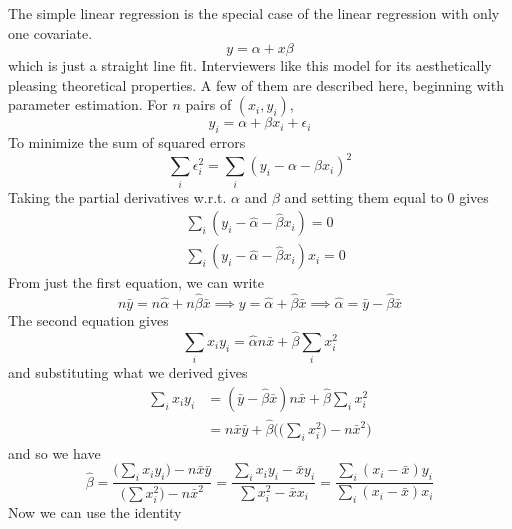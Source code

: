 \documentclass{article}
\begin{document}
    The simple linear regression is the special case of the linear regression with only one covariate. 
    \begin{equation}
      y = \alpha + x \beta
    \end{equation}
    which is just a straight line fit. Interviewers like this model for its aesthetically pleasing theoretical properties. A few of them are described here, beginning with parameter estimation. For $n$ pairs of $(x_i, y_i)$, 
    \begin{equation}
      y_i = \alpha + \beta x_i + \epsilon_i
    \end{equation}
    To minimize the sum of squared errors 
    \begin{equation}
      \sum_{i} \epsilon_i^2 = \sum_{i} (y_i - \alpha - \beta x_i)^2
    \end{equation}
    Taking the partial derivatives w.r.t. $\alpha$ and $\beta$ and setting them equal to $0$ gives 
    \begin{align*}
      &\sum_i (y_i - \hat{\alpha} - \hat{\beta} x_i) = 0 \\
      &\sum_i (y_i - \hat{\alpha} - \hat{\beta} x_i) x_i = 0
    \end{align*}
    From just the first equation, we can write 
    \begin{equation}
      n \bar{y} = n \hat{\alpha} + n \hat{\beta} \bar{x} \implies y = \hat{\alpha} + \hat{\beta} \bar{x} \implies \hat{\alpha}  = \bar{y} - \hat{\beta} \bar{x} 
    \end{equation}
    The second equation gives 
    \begin{equation}
      \sum_{i} x_i y_i = \hat{\alpha} n \bar{x} + \hat{\beta} \sum_{i} x_i^2
    \end{equation}
    and substituting what we derived gives 
    \begin{align*}
      \sum_{i} x_i y_i & = (\bar{y} - \hat{\beta} \bar{x}) n \bar{x} + \hat{\beta} \sum_i x_i^2 \\
      & = n \bar{x} \bar{y} + \hat{\beta} \bigg( \Big(\sum_i x_i^2 \Big) - n \bar{x}^2 \bigg)
    \end{align*}
    and so we have 
    \begin{equation}
      \hat{\beta} = \frac{ \big( \sum_i x_i y_i \big) - n \bar{x}\bar{y}}{\big( \sum x_i^2 \big) - n \bar{x}^2} = \frac{ \sum_i x_i y_i - \bar{x} y_i}{\sum x_i^2 - \bar{x} x_i} = \frac{ \sum_i (x_i - \bar{x}) y_i}{\sum_i (x_i - \bar{x}) x_i}
    \end{equation}
    Now we can use the identity
\end{document}
